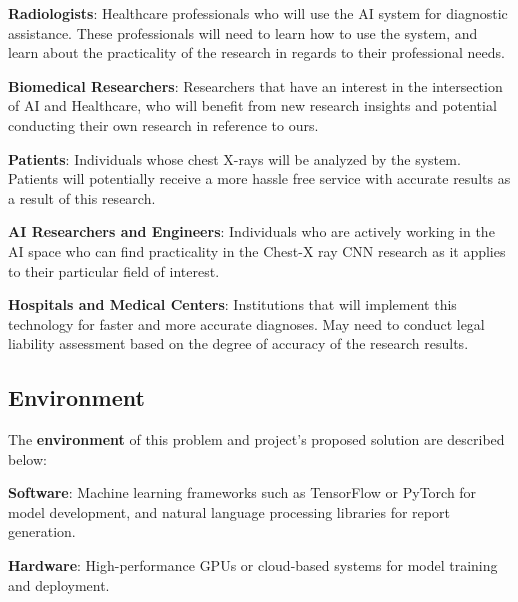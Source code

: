 \documentclass{article}
\begin{document}
\begin{itemize}
\begin{item}
    \textbf{Radiologists}: Healthcare professionals who will use the AI system for diagnostic assistance. 
    These professionals will need to learn how to use the system, and learn about the practicality of the research in regards to their professional needs.
\end{item}
\begin{item}
    \textbf{Biomedical Researchers}: Researchers that have an interest in the intersection of AI and Healthcare, who will benefit from new research insights and potential conducting their own research in reference to ours.
\end{item}
\begin{item}
    \textbf{Patients}: Individuals whose chest X-rays will be analyzed by the system. Patients will potentially receive a more hassle free service with accurate results as a result of this research.
\end{item}
\begin{item}
    \textbf{AI Researchers and Engineers}: Individuals who are actively working in the AI space who can find practicality in the Chest-X ray CNN research as it applies to their particular field of interest.
\end{item}
\begin{item}
    \textbf{Hospitals and Medical Centers}: Institutions that will implement this technology for faster and more accurate diagnoses. May need to conduct legal liability assessment based on the degree of accuracy of the research results.
\end{item}
\end{itemize}


\subsection{Environment}

The \textbf{environment} of this problem and project's proposed solution are described below:

\begin{itemize}
\begin{item}
\textbf{Software}:  Machine learning frameworks such as TensorFlow or PyTorch for model development, and natural language processing libraries for report generation.
\end{item}
\begin{item}
\textbf{Hardware}: High-performance GPUs or cloud-based systems for model training and deployment.
\end{item}
\end{itemize}
\end{document}
